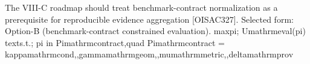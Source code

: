  The VIII-C roadmap should treat benchmark-contract normalization as a prerequisite for reproducible evidence aggregation [O\markdownRendererUnderscore{}ISAC\markdownRendererUnderscore{}327].\markdownRendererOlItemEnd 
\markdownRendererOlEnd \markdownRendererInterblockSeparator
{}
\markdownRendererSectionEnd \markdownRendererSectionBegin
{}\markdownRendererInterblockSeparator
{}Selected form: Option-B (benchmark-contract constrained evaluation).\markdownRendererParagraphSeparator
{}\markdownRendererDollarSign{}\markdownRendererDollarSign{}\markdownRendererSoftLineBreak
{}\markdownRendererBackslash{}max\markdownRendererUnderscore{}\markdownRendererLeftBrace{}\markdownRendererBackslash{}pi\markdownRendererRightBrace{}; U\markdownRendererUnderscore{}\markdownRendererLeftBrace{}\markdownRendererBackslash{}mathrm\markdownRendererLeftBrace{}eval\markdownRendererRightBrace{}\markdownRendererRightBrace{}(\markdownRendererBackslash{}pi)\markdownRendererSoftLineBreak
{}\markdownRendererDollarSign{}\markdownRendererDollarSign{}\markdownRendererSoftLineBreak
{}\markdownRendererDollarSign{}\markdownRendererDollarSign{}\markdownRendererSoftLineBreak
{}\markdownRendererBackslash{}text\markdownRendererLeftBrace{}s.t.\markdownRendererRightBrace{}; \markdownRendererBackslash{}pi \markdownRendererBackslash{}in \markdownRendererBackslash{}Pi\markdownRendererUnderscore{}\markdownRendererLeftBrace{}\markdownRendererBackslash{}mathrm\markdownRendererLeftBrace{}contract\markdownRendererRightBrace{}\markdownRendererRightBrace{},\markdownRendererBackslash{}quad\markdownRendererSoftLineBreak
{}\markdownRendererBackslash{}Pi\markdownRendererUnderscore{}\markdownRendererLeftBrace{}\markdownRendererBackslash{}mathrm\markdownRendererLeftBrace{}contract\markdownRendererRightBrace{}\markdownRendererRightBrace{} = \markdownRendererLeftBrace{}\markdownRendererBackslash{}kappa\markdownRendererUnderscore{}\markdownRendererLeftBrace{}\markdownRendererBackslash{}mathrm\markdownRendererLeftBrace{}cond\markdownRendererRightBrace{}\markdownRendererRightBrace{},,\markdownRendererBackslash{}gamma\markdownRendererUnderscore{}\markdownRendererLeftBrace{}\markdownRendererBackslash{}mathrm\markdownRendererLeftBrace{}geom\markdownRendererRightBrace{}\markdownRendererRightBrace{},,\markdownRendererBackslash{}mu\markdownRendererUnderscore{}\markdownRendererLeftBrace{}\markdownRendererBackslash{}mathrm\markdownRendererLeftBrace{}metric\markdownRendererRightBrace{}\markdownRendererRightBrace{},,\markdownRendererBackslash{}delta\markdownRendererUnderscore{}\markdownRendererLeftBrace{}\markdownRendererBackslash{}mathrm\markdownRendererLeftBrace{}prov\markdownRendererRightBrace{}\markdownRendererRightBrace{}\markdownRendererRightBrace{}\markdownRendererSoftLineBreak
